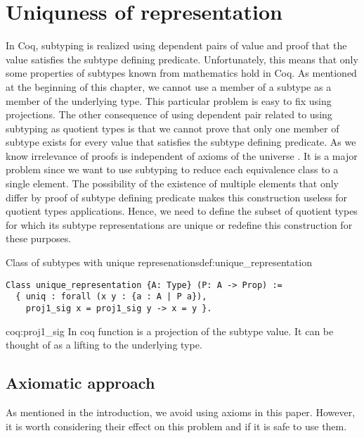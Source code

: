 \section{Uniquness of representation}
In Coq, subtyping is realized using dependent pairs of value and proof that the value satisfies the subtype defining predicate. Unfortunately, this means that only some properties of subtypes known from mathematics hold in Coq. As mentioned at the beginning of this chapter, we cannot use a member of a subtype as a member of the underlying type. This particular problem is easy to fix using projections. The other consequence of using dependent pair related to using subtyping as quotient types is that we cannot prove that only one member of subtype exists for every value that satisfies the subtype defining predicate. As we know irrelevance of proofs is independent of axioms of the  universe \cite{CoqBook2}. It is a major problem since we want to use subtyping to reduce each equivalence class to a single element. The possibility of the existence of multiple elements that only differ by proof of subtype defining predicate makes this construction useless for quotient types applications. Hence, we need to define the subset of quotient types for which its subtype representations are unique or redefine this construction for these purposes.
\begin{defi}{Class of subtypes with unique represenations}{def:unique_representation}
\begin{verbatim}
Class unique_representation {A: Type} (P: A -> Prop) := 
  { uniq : forall (x y : {a : A | P a}), 
    proj1_sig x = proj1_sig y -> x = y }.
\end{verbatim}
\end{defi}
\begin{coq}{}{coq:proj1_sig}
In coq function  is a projection of the subtype value. It can be thought of as a lifting to the underlying type.
\end{coq}
\subsection{Axiomatic approach}
As mentioned in the introduction, we avoid using axioms in this paper. However, it is worth considering their effect on this problem and if it is safe to use them.
